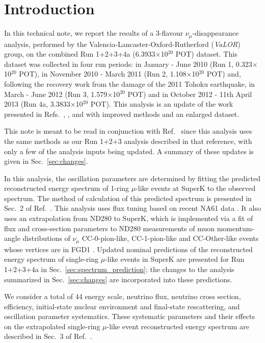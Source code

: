 \clearpage

\section {Introduction }
\label{sec:intro}

In this technical note, 
we report the results of a 3-flavour $\nu_{\mu}$-disappearance analysis,
performed by the Valencia-Lancaster-Oxford-Rutherford ({\em VaLOR}) group,        
on the combined Run 1+2+3+4a (6.3933$\times$10$^{20}$ POT) dataset.
This dataset was collected in four run periods:
in January - June 2010 (Run 1, 0.323$\times$10$^{20}$ POT),
in November 2010 - March 2011 (Run 2, 1.108$\times$10$^{20}$ POT) and,
following the recovery work from the damage of the 2011 Tohoku earthquake, 
in March - June 2012 (Run 3, 1.579$\times$10$^{20}$ POT) and
in October 2012 - 11th April 2013 (Run 4a, 3.3833$\times$10$^{20}$ POT).
This analysis is an update of the work presented in Refs.\ \cite{OurRun1DisappAnalysis}, \cite{OurRun12DisappAnalysis}, 
\cite{OurRun12DisappAnalysis3Flavour} and \cite{OurRun123DisappAnalysis3Flavour} with improved methods and an enlarged dataset. 

This note is meant to be read in conjunction with Ref.\ \cite{OurRun123DisappAnalysis3Flavour} since this analysis uses the same 
methods as our Run 1+2+3 analysis described in that reference,
with only a few of the analysis inputs being updated.
A summary of these updates is given in Sec.\ \ref{sec:changes}.

In this analysis, the oscillation parameters are determined
by fitting the predicted reconstructed energy spectrum
of 1-ring $\mu$-like events at SuperK to the observed spectrum.
The method of calculation of this predicted spectrum is presented in Sec.\ 2 of Ref.\ \cite{OurRun123DisappAnalysis3Flavour}.
This analysis uses flux tuning based on recent NA61 data \cite{FluxTuning}\cite{NA61T2K}. 
It also uses an extrapolation from ND280 to SuperK, which is implemented via a fit of flux and cross-section parameters to
ND280 measurements of muon momentum-angle distributions of $\nu_\mu$
CC-0-pion-like, CC-1-pion-like and CC-Other-like events whose 
vertices are in FGD1 \cite{BANFF2013}.
Updated nominal predictions of the reconstructed energy spectrum of single-ring $\mu$-like events in SuperK are presented for Run 1+2+3+4a 
in Sec.\ \ref{sec:spectrum_prediction}; the changes to the analysis summarized in Sec.\ \ref{sec:changes} are incorporated 
into these predictions. 

We consider a total of 44 energy scale, neutrino flux, neutrino cross section,
efficiency, initial-state nuclear environment and final-state rescattering,
and oscillation parameter systematics. 
These systematic parameters and their effects 
on the extrapolated single-ring $\mu$-like event reconstructed energy spectrum are described in Sec.\ 3
of Ref.\ \cite{OurRun123DisappAnalysis3Flavour}.

